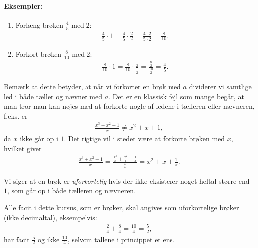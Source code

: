 \paragraph{Eksempler:}
\begin{enumerate}
\item Forlæng brøken $\frac{4}{5}$ med $2$:
\begin{align*}
\frac{4}{5} \cdot 1 = \frac{4}{5} \cdot \frac{2}{2} = \frac{4 \cdot 2}{5 \cdot 2} = \frac{8}{10}.
\end{align*}
\item Forkort brøken $\frac{8}{10}$ med $2$:
\begin{align*}
\frac{8}{10} \cdot 1 = \frac{8}{10} \cdot  \frac{\frac{1}{2}}{\frac{1}{2}} = \frac{\frac{8}{2}}{\frac{10}{2}} = \frac{4}{5}.
\end{align*}
\end{enumerate}
Bemærk at dette betyder, at når vi forkorter en brøk med $a$ dividerer vi samtlige led i både tæller og nævner med $a$. Det er en klassisk fejl som mange begår, at man tror man kan nøjes med at forkorte nogle af ledene i tælleren eller nævneren, f.eks. er
\begin{align*}
\frac{x^3+x^2+1}{x} \neq x^2+x+1,
\end{align*} 
da $x$ ikke går op i $1$. Det rigtige vil i stedet være at forkorte brøken med $x$, hvilket giver
\begin{align*}
\frac{x^3+x^2+1}{x}= \frac{\frac{x^3}{x}+\frac{x^2}{x}+ \frac{1}{x}}{\frac{x}{x}} = x^2+x+\frac{1}{x}.
\end{align*}

Vi siger at en brøk er \emph{uforkortelig} hvis der ikke eksisterer noget heltal større end $1$, som går op i både tælleren og nævneren. 

Alle facit i dette kursus, som er brøker, skal angives som uforkortelige brøker (ikke decimaltal), eksempelvis:
\begin{align*}
\frac{2}{4}+\frac{8}{4} = \frac{10}{4} = \frac{5}{2},
\end{align*}
har facit $\frac{5}{2}$ og ikke $\frac{10}{4}$, selvom tallene i princippet et ens. 













